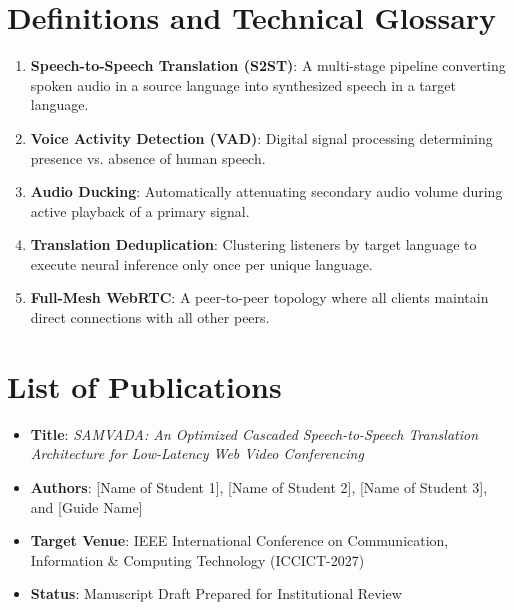 \documentclass[12pt,a4paper]{report}
\begin{document}
\chapter{Definitions and Technical Glossary}
\begin{enumerate}
    \item \textbf{Speech-to-Speech Translation (S2ST)}: A multi-stage pipeline converting spoken audio in a source language into synthesized speech in a target language.
    \item \textbf{Voice Activity Detection (VAD)}: Digital signal processing determining presence vs. absence of human speech.
    \item \textbf{Audio Ducking}: Automatically attenuating secondary audio volume during active playback of a primary signal.
    \item \textbf{Translation Deduplication}: Clustering listeners by target language to execute neural inference only once per unique language.
    \item \textbf{Full-Mesh WebRTC}: A peer-to-peer topology where all clients maintain direct connections with all other peers.
\end{enumerate}

\chapter{List of Publications}
\begin{itemize}
    \item \textbf{Title}: \textit{SAMVADA: An Optimized Cascaded Speech-to-Speech Translation Architecture for Low-Latency Web Video Conferencing}
    \item \textbf{Authors}: [Name of Student 1], [Name of Student 2], [Name of Student 3], and [Guide Name]
    \item \textbf{Target Venue}: IEEE International Conference on Communication, Information \& Computing Technology (ICCICT-2027)
    \item \textbf{Status}: Manuscript Draft Prepared for Institutional Review
\end{itemize}
\end{document}

